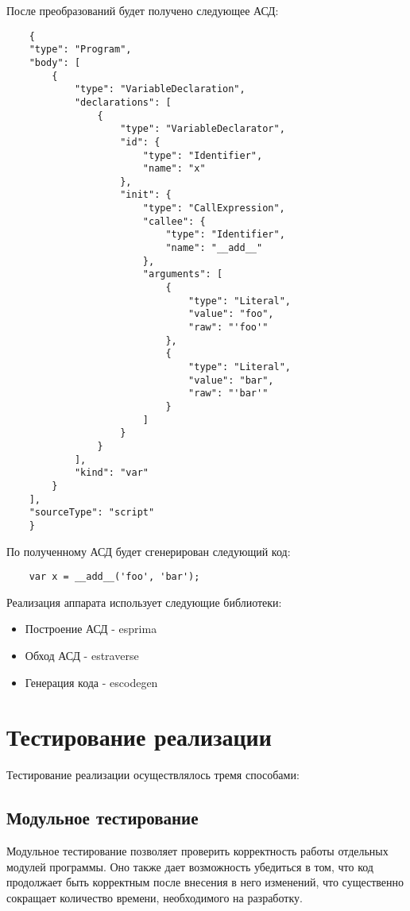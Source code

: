 После преобразований будет получено следующее АСД:

\bigskip
\begin{lstlisting}
	{
    "type": "Program",
    "body": [
        {
            "type": "VariableDeclaration",
            "declarations": [
                {
                    "type": "VariableDeclarator",
                    "id": {
                        "type": "Identifier",
                        "name": "x"
                    },
                    "init": {
                        "type": "CallExpression",
                        "callee": {
                            "type": "Identifier",
                            "name": "__add__"
                        },
                        "arguments": [
                            {
                                "type": "Literal",
                                "value": "foo",
                                "raw": "'foo'"
                            },
                            {
                                "type": "Literal",
                                "value": "bar",
                                "raw": "'bar'"
                            }
                        ]
                    }
                }
            ],
            "kind": "var"
        }
    ],
    "sourceType": "script"
	}
\end{lstlisting}


По полученному АСД будет сгенерирован следующий код:

\bigskip
\begin{lstlisting}
	var x = __add__('foo', 'bar');
\end{lstlisting}


Реализация аппарата использует следующие библиотеки:

\begin{itemize}
	\item Построение АСД - esprima \cite{esprima}
	\item Обход АСД - estraverse \cite{estraverse}
	\item Генерация кода -  escodegen \cite{escodegen}
\end{itemize}


\section{Тестирование реализации}
\label{tainting}
Тестирование реализации осуществлялось тремя способами:

\subsection{Модульное тестирование} 
	Модульное тестирование позволяет проверить корректность работы отдельных модулей программы. Оно также дает возможность убедиться в том, что код продолжает быть корректным после внесения в него изменений, что существенно сокращает количество времени, необходимого на разработку.


